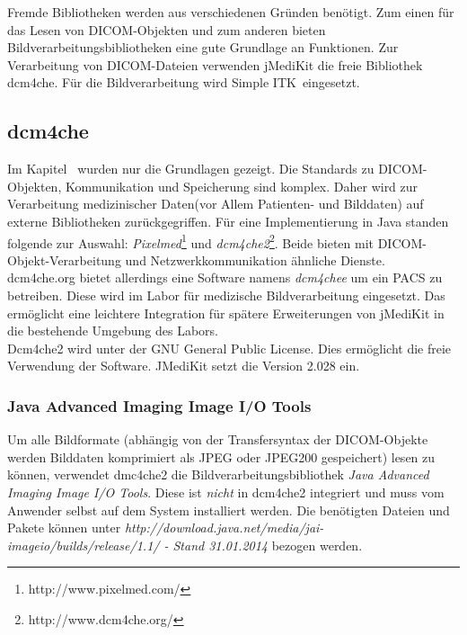 Fremde Bibliotheken werden aus verschiedenen Gründen benötigt. Zum einen für das Lesen von DICOM-Objekten und zum anderen bieten Bildverarbeitungsbibliotheken eine gute Grundlage an Funktionen. Zur Verarbeitung von DICOM-Dateien verwenden jMediKit die freie Bibliothek \glqq dcm4che\grqq. Für die Bildverarbeitung wird \glqq Simple ITK\grqq\ eingesetzt.

\subsection{dcm4che}
Im Kapitel \glqq {}\grqq\ wurden nur die Grundlagen gezeigt. Die Standards zu DICOM-Objekten, Kommunikation und Speicherung sind komplex. Daher wird zur Verarbeitung medizinischer Daten(vor Allem Patienten- und Bilddaten) auf externe Bibliotheken zurückgegriffen. Für eine Implementierung in Java standen folgende zur Auswahl: \textit{Pixelmed}\footnote{http://www.pixelmed.com/} und \textit{dcm4che2}\footnote{http://www.dcm4che.org/}. Beide bieten mit DICOM-Objekt-Verarbeitung und Netzwerkkommunikation ähnliche Dienste.\\
dcm4che.org bietet allerdings eine Software namens \textit{dcm4chee} um ein PACS zu betreiben. Diese wird im Labor für medizische Bildverarbeitung eingesetzt. Das ermöglicht eine leichtere Integration für spätere Erweiterungen von jMediKit in die bestehende Umgebung des Labors.\\
Dcm4che2 wird unter der GNU General Public License. Dies ermöglicht die freie Verwendung der Software. JMediKit setzt die Version 2.028 ein.

\subsubsection{Java Advanced Imaging Image I/O Tools}
Um alle Bildformate (abhängig von der Transfersyntax der DICOM-Objekte werden Bilddaten komprimiert als JPEG oder JPEG200 gespeichert) lesen zu können, verwendet dmc4che2 die Bildverarbeitungsbibliothek \textit{Java Advanced Imaging Image I/O Tools}. Diese ist \textit{nicht} in dcm4che2 integriert und muss vom Anwender selbst auf dem System installiert werden. Die benötigten Dateien und Pakete können unter \textit{http://download.java.net/media/jai-imageio/builds/release/1.1/ - Stand 31.01.2014} bezogen werden.

